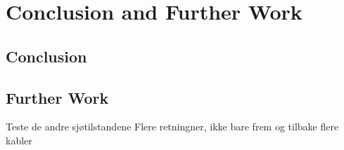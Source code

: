\chapter{Conclusion and Further Work}
\label{chap:conclusion}
\section{Conclusion}


\section{Further Work}
Teste de andre sjøtilstandene\newline
Flere retningner, ikke bare frem og tilbake\newline
flere kabler\newline
  